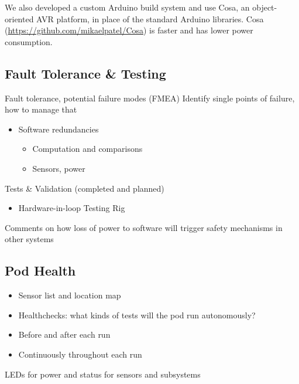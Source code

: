 \documentclass[main.tex]{subfiles}
\begin{document}
    We also developed a custom Arduino build system and use Cosa, an object-oriented AVR platform, in place of the standard Arduino libraries. Cosa (\url{https://github.com/mikaelpatel/Cosa}) is faster and has lower power consumption.
    \subsection{Fault Tolerance \& Testing}
    Fault tolerance, potential failure modes (FMEA)
    Identify single points of failure, how to manage that
    \begin{itemize}
        \item Software redundancies
        \begin{itemize}
            \item Computation and comparisons
            \item Sensors, power
        \end{itemize}
    \end{itemize}
    Tests \& Validation (completed and planned)
    \begin{itemize}
        \item Hardware-in-loop Testing Rig
    \end{itemize}
    Comments on how loss of power to software will trigger safety mechanisms in other systems

    \subsection{Pod Health}
    \begin{itemize}
        \item Sensor list and location map
        \item Healthchecks: what kinds of tests will the pod run autonomously?
        \item Before and after each run
        \item Continuously throughout each run
    \end{itemize}
    LEDs for power and status for sensors and subsystems
\end{document}
